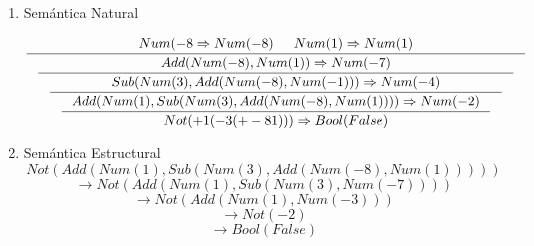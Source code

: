 \documentclass{article}
\begin{document}
\begin{enumerate}
\begin{itemize}
\begin{enumerate}
                \begin{figure}[!htb]
                    \centering
                \end{figure}
            
            \item Semántica Natural

                \[
                    \inference{Num(-8 \Rightarrow Num(-8) &
                    Num(1) \Rightarrow Num(1)}{
                        \inference{Add(Num(-8), Num(1)) \Rightarrow Num(-7)}
                            {\inference{Sub(Num(3), Add(Num(-8), Num(-1))) \Rightarrow Num(-4)}
                                {\inference{Add(Num(1), Sub(Num(3), Add(Num(-8), Num(1)))) \Rightarrow Num(-2) }{Not(+1(-3(+ -8  1))) \Rightarrow Bool(False) }}}
                    }   
                
                \]
            
            \item Semántica Estructural
                \[ Not(Add(Num(1), Sub(Num(3), Add(Num(-8), Num(1))))) \]
                \[ \rightarrow Not(Add(Num(1), Sub(Num(3), Num(-7)))) \]
                \[ \rightarrow Not(Add(Num(1), Num(-3))) \]
                \[ \rightarrow Not(-2) \]
                \[ \rightarrow Bool(False) \]
                


\end{enumerate}
\end{itemize}
\end{enumerate}
\end{document}
